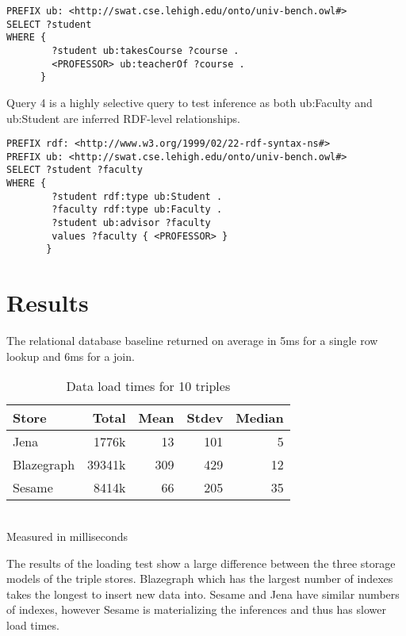 \documentclass{llncs}
\begin{document}
\begin{lstlisting}[caption=Query 3]
PREFIX ub: <http://swat.cse.lehigh.edu/onto/univ-bench.owl#>
SELECT ?student
WHERE {
        ?student ub:takesCourse ?course .
        <PROFESSOR> ub:teacherOf ?course .
      }
\end{lstlisting}

\smallskip

Query 4 is a highly selective query to test inference as both ub:Faculty and ub:Student are inferred RDF-level relationships.

\begin{lstlisting}[caption=Query 4]
PREFIX rdf: <http://www.w3.org/1999/02/22-rdf-syntax-ns#>
PREFIX ub: <http://swat.cse.lehigh.edu/onto/univ-bench.owl#>
SELECT ?student ?faculty
WHERE {
        ?student rdf:type ub:Student .
        ?faculty rdf:type ub:Faculty .
        ?student ub:advisor ?faculty 
        values ?faculty { <PROFESSOR> }
       }
\end{lstlisting}

\section{Results}
The relational database baseline returned on average in 5ms for a single row lookup and 6ms for a join.

\begin{table}
\begin{center}
\caption{Data load times for 10 triples}
\begin{tabular}{l | r r r r }
Store & Total & Mean & Stdev & Median \\
\hline
Jena & 1776k & 13 & 101 & 5 \\
Blazegraph & 39341k & 309 & 429 & 12 \\
Sesame & 8414k & 66 & 205 & 35
\end{tabular}
\\[5pt]
Measured in milliseconds
\end{center}
\end{table}
The results of the loading test show a large difference between the three storage models of the triple stores.  Blazegraph which has the largest number of indexes takes the longest to insert new data into. Sesame and Jena have similar numbers of indexes, however Sesame is materializing the inferences and thus has slower load times.
\end{document}
